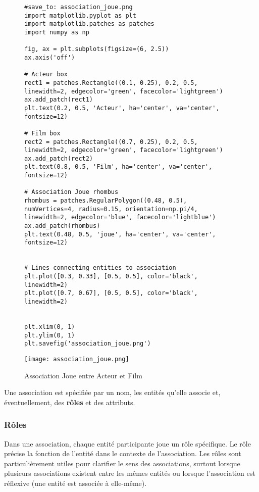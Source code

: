 \documentclass{article}
\begin{document}
\begin{figure}[H]
    \centering
    \begin{verbatim}
#save_to: association_joue.png
import matplotlib.pyplot as plt
import matplotlib.patches as patches
import numpy as np

fig, ax = plt.subplots(figsize=(6, 2.5))
ax.axis('off')

# Acteur box
rect1 = patches.Rectangle((0.1, 0.25), 0.2, 0.5, linewidth=2, edgecolor='green', facecolor='lightgreen')
ax.add_patch(rect1)
plt.text(0.2, 0.5, 'Acteur', ha='center', va='center', fontsize=12)

# Film box
rect2 = patches.Rectangle((0.7, 0.25), 0.2, 0.5, linewidth=2, edgecolor='green', facecolor='lightgreen')
ax.add_patch(rect2)
plt.text(0.8, 0.5, 'Film', ha='center', va='center', fontsize=12)

# Association Joue rhombus
rhombus = patches.RegularPolygon((0.48, 0.5), numVertices=4, radius=0.15, orientation=np.pi/4, linewidth=2, edgecolor='blue', facecolor='lightblue')
ax.add_patch(rhombus)
plt.text(0.48, 0.5, 'joue', ha='center', va='center', fontsize=12)


# Lines connecting entities to association
plt.plot([0.3, 0.33], [0.5, 0.5], color='black', linewidth=2)
plt.plot([0.7, 0.67], [0.5, 0.5], color='black', linewidth=2)


plt.xlim(0, 1)
plt.ylim(0, 1)
plt.savefig('association_joue.png')

        \end{verbatim}
        \texttt{[image: association\_joue.png]}
        \caption{Association Joue entre Acteur et Film}
        \label{fig:association_joue}
    \end{figure}


Une association est spécifiée par un nom, les entités qu'elle associe et, éventuellement, des \textbf{rôles} et des attributs.

\subsubsection{Rôles}

Dans une association, chaque entité participante joue un rôle spécifique. Le rôle précise la fonction de l'entité dans le contexte de l'association.  Les rôles sont particulièrement utiles pour clarifier le sens des associations, surtout lorsque plusieurs associations existent entre les mêmes entités ou lorsque l'association est réflexive (une entité est associée à elle-même).
\end{document}
